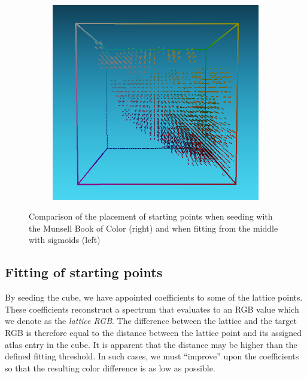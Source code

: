 \begin{figure}[t]
\begin{subfigure}[t]{0.45\textwidth}
		\includegraphics[width=\linewidth]{img/seededStarting_mcb.png}
		\label{fig:seededStarting_mcb}
	\end{subfigure}
	\caption{Comparison of the placement of starting points when seeding with the Munsell Book of Color (right) and when fitting from the middle with sigmoids (left)}
	\label{fig:seededStartingPoints}
\end{figure}

\subsection{Fitting of starting points} \label{ssec:startingPointsFitting}

By seeding the cube, we have appointed coefficients to some of the lattice points. These coefficients reconstruct a spectrum that evaluates to an RGB value which we denote as the \emph{lattice RGB}. The difference between the lattice and the target RGB is therefore equal to the distance between the lattice point and its assigned atlas entry in the cube. It is apparent that the distance may be higher than the defined fitting threshold. In such cases, we must ``improve'' upon the coefficients so that the resulting color difference is as low as possible.

